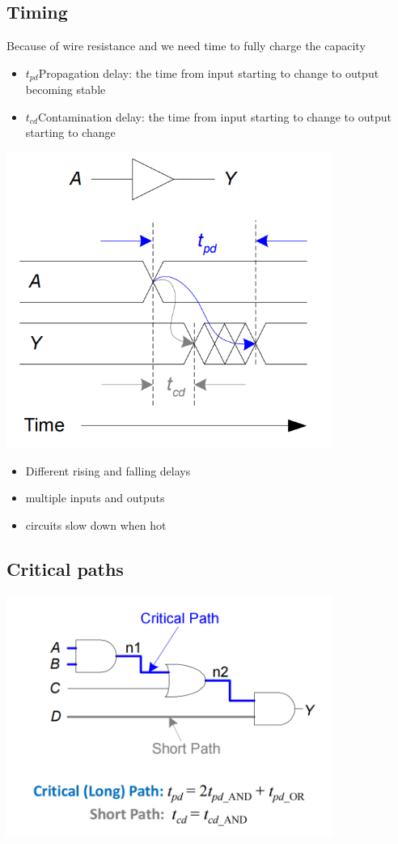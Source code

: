 \documentclass[12pt]{article}
\begin{document}
\subsection{Timing}
Because of wire resistance and we need time to fully charge the capacity
\begin{itemize}
    \item $t_{pd}$Propagation delay: the time from input starting to change to output becoming stable
    \item $t_{cd}$Contamination delay: the time from input starting to change to output starting to change
\end{itemize}
\includegraphics[width=0.8\textwidth]{Delay.png}
\begin{itemize}
    \item Different rising and falling delays
    \item multiple inputs and outputs
    \item circuits slow down when hot
\end{itemize}
\subsection{Critical paths}
\includegraphics[width=0.8\textwidth]{CriticalPath.png}
\end{document}
